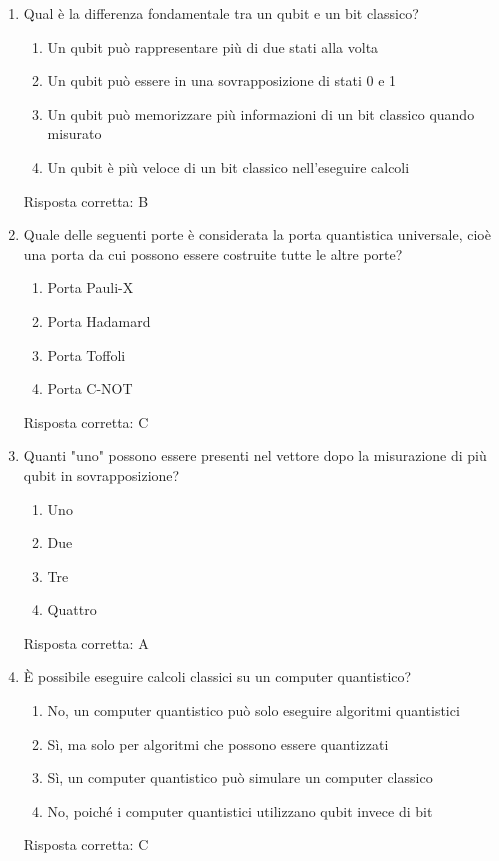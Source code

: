 \documentclass{article}
\begin{document}
\begin{enumerate}[label=\textbf{Domanda \arabic*.}]
\item Qual è la differenza fondamentale tra un qubit e un bit classico?
\begin{enumerate}[label=\Alph*.]
\item Un qubit può rappresentare più di due stati alla volta
\item Un qubit può essere in una sovrapposizione di stati 0 e 1
\item Un qubit può memorizzare più informazioni di un bit classico quando misurato
\item Un qubit è più veloce di un bit classico nell'eseguire calcoli
\end{enumerate}
Risposta corretta: B

\item Quale delle seguenti porte è considerata la porta quantistica universale, cioè una porta da cui possono essere costruite tutte le altre porte?
\begin{enumerate}[label=\Alph*.]
    \item Porta Pauli-X
    \item Porta Hadamard
    \item Porta Toffoli
    \item Porta C-NOT
\end{enumerate}
Risposta corretta: C

\item Quanti "uno" possono essere presenti nel vettore dopo la misurazione di più qubit in sovrapposizione?
\begin{enumerate}[label=\Alph*.]
    \item Uno
    \item Due
    \item Tre
    \item Quattro
\end{enumerate}
Risposta corretta: A

\item È possibile eseguire calcoli classici su un computer quantistico?
\begin{enumerate}[label=\Alph*.]

\item No, un computer quantistico può solo eseguire algoritmi quantistici
\item Sì, ma solo per algoritmi che possono essere quantizzati
\item Sì, un computer quantistico può simulare un computer classico
\item No, poiché i computer quantistici utilizzano qubit invece di bit
\end{enumerate}
Risposta corretta: C


\end{enumerate}
\end{document}
